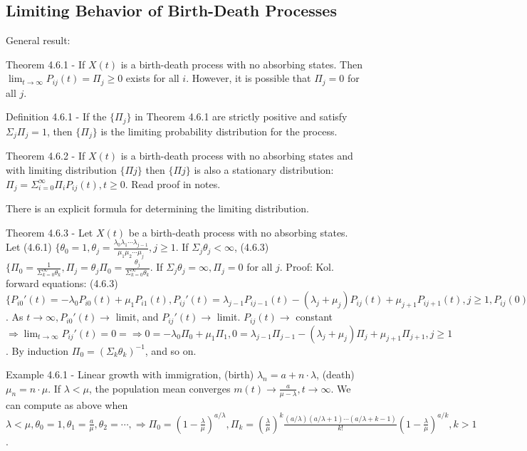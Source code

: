 \documentclass{article}
\begin{document}
\subsection{Limiting Behavior of Birth-Death Processes}

General result:

Theorem 4.6.1 - If $X(t)$ is a birth-death process with no absorbing states. Then $\lim_{t \rightarrow \infty} P_{ij}(t) = \Pi_j \ge 0$ exists for all $i$. However, it is possible that $\Pi_j = 0$ for all $j$.

Definition 4.6.1 - If the $\{\Pi_j\}$ in Theorem 4.6.1 are strictly positive and satisfy $\Sigma_j \Pi_j = 1$, then $\{\Pi_j\}$ is the limiting probability distribution for the process.

Theorem 4.6.2 - If $X(t)$ is a birth-death process with no absorbing states and with limiting distribution $\{\Pi j\}$ then $\{\Pi j\}$ is also a stationary distribution: $\Pi_j = \Sigma_{i=0}^\infty \Pi_i P_{ij}(t), t \ge 0$. Read proof in notes.

There is an explicit formula for determining the limiting distribution.

Theorem 4.6.3 - Let $X(t)$ be a birth-death process with no absorbing states. Let (4.6.1) $\{\theta_0 = 1, \theta_j = \frac{\lambda_0 \lambda_1 \cdots \lambda_{j-1}}{\mu_1 \mu_2 \cdots \mu_j}, j \ge 1$. If $\Sigma_j \theta_j < \infty$, (4.6.3) $\{\Pi_0 = \frac{1}{\Sigma_{k=0}^\infty \theta_k}, \Pi_j = \theta_j \Pi_0 = \frac{\theta_j}{\Sigma_{k=0}^\infty \theta_k}$. If $\Sigma_j \theta_j = \infty, \Pi_j = 0$ for all $j$. Proof: Kol. forward equations: (4.6.3) $\{P_{i0}'(t) = -\lambda_0 P_{i0}(t) + \mu_1 P_{i1}(t), P_{ij}'(t) = \lambda_{j-1}P_{ij-1}(t) - (\lambda_j + \mu_j) P_{ij}(t) + \mu_{j+1}P_{ij+1}(t), j \ge 1, P_{ij}(0) = \delta_{ij}$. As $t \rightarrow \infty, P_{i0}'(t) \rightarrow$ limit, and $P_{ij}'(t) \rightarrow$ limit. $P_{ij}(t) \rightarrow$ constant $\Rightarrow \lim_{t \rightarrow \infty} P_{ij}'(t) = 0 = \Rightarrow 0 = -\lambda_0 \Pi_0 + \mu_1 \Pi_1, 0 = \lambda_{j-1} \Pi_{j-1} - (\lambda_j + \mu_j) \Pi_j + \mu_{j+1} \Pi_{j+1}, j \ge 1$. By induction $\Pi_0 = (\Sigma_k \theta_k)^{-1}$, and so on.

Example 4.6.1 - Linear growth with immigration, (birth) $\lambda_n = a + n \cdot \lambda$, (death) $\mu_n = n \cdot \mu$. If $\lambda < \mu$, the population mean converges $m(t) \rightarrow \frac{a}{\mu - \lambda}, t \rightarrow \infty$. We can compute as above when $\lambda < \mu, \theta_0 = 1, \theta_1 = \frac{a}{\mu}, \theta_2 = \cdots, \Rightarrow \Pi_0 = (1 - \frac{\lambda}{\mu})^{a / \lambda}, \Pi_k = (\frac{\lambda}{\mu})^k \frac{(a/\lambda)(a/\lambda+1)\cdots(a/\lambda+k-1)}{k!}(1 - \frac{\lambda}{\mu})^{a/k}, k > 1$.
\end{document}
